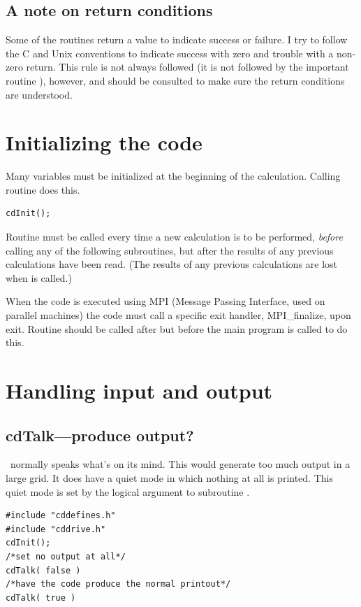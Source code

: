 \subsection{A note on return conditions}

Some of the routines return a value to indicate success or failure.
I try to follow the C and Unix conventions to indicate success with zero
and trouble with a non-zero return.
This rule is not always followed (it
is not followed by the important routine ),
however, and 
should be consulted to make sure the return conditions are understood.

\section{Initializing the code}

Many variables must be initialized at the beginning of the calculation.
Calling routine  does this.
\begin{verbatim}
cdInit();
\end{verbatim}
Routine  must be called every time
a new calculation is to be
performed, \emph{before} calling any of the following subroutines,
but after the
results of any previous calculations have been read.
(The results of any
previous calculations are lost when  is called.)

  When the code is executed using MPI (Message Passing Interface,
used on parallel machines)  the code must call a specific exit handler,
MPI\_finalize, upon exit.
Routine  should be called after
 but
before the main program is called to do this.

\section{Handling input and output}

\subsection{cdTalk---produce output?}

\Cloudy\ normally speaks what's on its mind.
This would generate too much
output in a large grid.
It does have a quiet mode in which nothing at all
is printed.
This quiet mode is set by the logical argument to subroutine
.
\begin{verbatim}
#include "cddefines.h"
#include "cddrive.h"
cdInit();
/*set no output at all*/
cdTalk( false )
/*have the code produce the normal printout*/
cdTalk( true )
\end{verbatim}

